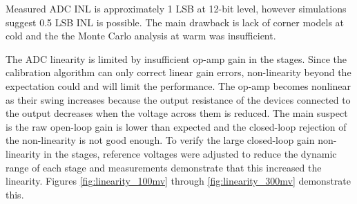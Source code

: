 \label{sec:5.3}


Measured ADC INL is approximately 1 LSB at 12-bit level, however simulations suggest 0.5 LSB INL is possible. The main drawback is lack of corner models at cold and the the Monte Carlo analysis at warm was insufficient.





The ADC linearity is limited by insufficient op-amp gain in the stages. Since the calibration algorithm can only correct linear gain errors, non-linearity beyond the expectation could and will limit the performance. The op-amp becomes nonlinear as their swing increases because the output resistance of the devices connected to the output decreases when the voltage across them is reduced. The main suspect is the raw open-loop gain is lower than expected and the closed-loop rejection of the non-linearity is not good enough. To verify the large closed-loop gain non-linearity in the stages, 
reference voltages were adjusted to reduce the dynamic range of each stage and measurements demonstrate that this increased the linearity.
Figures \ref{fig:linearity_100mv} through \ref{fig:linearity_300mv} demonstrate this. 


